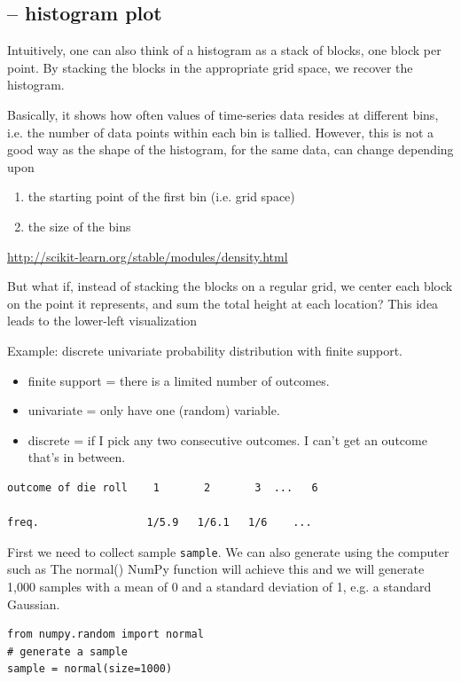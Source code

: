 \subsection{-- histogram plot}
\label{sec:histogram}


Intuitively, one can also think of a histogram as a stack of blocks, one block
per point.  By stacking the blocks in the appropriate grid space, we recover the
histogram.

Basically, it shows how often values of time-series data resides at different
bins, i.e. the number of data points within each bin is tallied.
However, this is not a good way as the shape of the histogram, for the same
data, can change depending upon
\begin{enumerate}
  \item the starting point of the first bin (i.e. grid space)
  
  \item the size of the bins
\end{enumerate}
\url{http://scikit-learn.org/stable/modules/density.html}

But what if, instead of stacking the blocks on a regular grid, we center each
block on the point it represents, and sum the total height at each location?
This idea leads to the lower-left visualization  

Example: discrete univariate probability distribution with finite support.
\begin{itemize}
  \item finite support = there is a limited number of outcomes.
  
  \item univariate = only have one (random) variable. 
  
  \item discrete = if I pick any two consecutive outcomes. I can’t get an outcome that’s in between. 
\end{itemize}

\begin{verbatim}
outcome of die roll    1       2       3  ...   6

freq.                 1/5.9   1/6.1   1/6    ...
\end{verbatim}

First we need to collect sample \verb!sample!. We can also generate using the
computer such as The normal() NumPy function will achieve this and we will
generate 1,000 samples with a mean of 0 and a standard deviation of 1, e.g. a
standard Gaussian.
\begin{lstlisting}
from numpy.random import normal
# generate a sample
sample = normal(size=1000)
\end{lstlisting}


